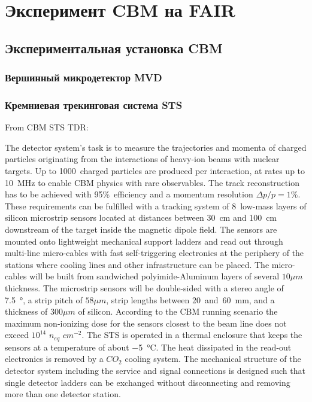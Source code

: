 \chapter{Эксперимент CBM на FAIR}\label{sec:secCbm}

\section{Экспериментальная установка CBM}\label{sec:secCbmSetup}

\subsection{Вершинный микродетектор MVD}\label{sec:secMVD}

\subsection{Кремниевая трекинговая система STS}\label{sec:secSTS}

From CBM STS TDR:

The detector system’s task is to measure the trajectories and momenta of charged particles originating from the interactions of heavy-ion beams with nuclear targets. Up to 1000~charged particles are produced per interaction, at rates up to 10~MHz to enable CBM physics with rare observables. The track reconstruction has to be achieved with 95\%~efficiency and a momentum resolution $\Delta p / p = 1\%$. These requirements can be fulfilled with a tracking system of 8~low-mass layers of silicon microstrip sensors located at distances between 30~cm and 100~cm downstream of the target inside the magnetic dipole field.
The sensors are mounted onto lightweight mechanical support ladders and read out through multi-line micro-cables with fast self-triggering electronics at the periphery of the stations where cooling lines and other infrastructure can be placed. The micro-cables will be built from sandwiched polyimide-Aluminum layers of several $10 \mu m$ thickness. The microstrip sensors will be double-sided with a stereo angle of \SI{7.5}{\degree}, a strip pitch of $58 \mu m$, strip lengths between 20~and~60~mm, and a thickness of $300 \mu m$ of silicon. According to the CBM running scenario the maximum non-ionizing dose for the sensors closest to the beam line does not exceed $10^{14}$ $n_{eq}$ $cm^{-2}$. The STS is operated in a thermal enclosure that keeps the sensors at a temperature of about \SI{-5}{\degreeCelsius}. The heat dissipated in the read-out electronics is removed by a $CO_{2}$ cooling system. The mechanical structure of the detector system including the service and signal connections is designed such that single detector ladders can be exchanged without disconnecting and removing more than one detector station.

